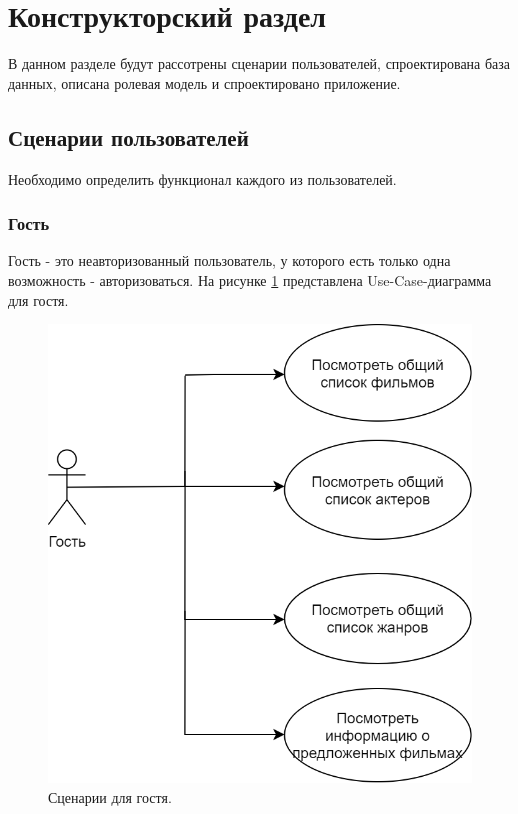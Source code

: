 \clearpage
\section{Конструкторский раздел}
В данном разделе будут рассотрены сценарии пользователей, спроектирована база данных, описана ролевая модель и спроектировано приложение.
\subsection{Сценарии пользователей}
Необходимо определить функционал каждого из пользователей. 
\subsubsection{Гость}
Гость - это неавторизованный пользователь, у которого есть только одна возможность - авторизоваться. На рисунке \ref{img:UseCaseGuest} представлена Use-Case-диаграмма для гостя.

\begin{figure}[h!]
	\centering
	\includegraphics[scale=0.35]{img/UseCaseGuest.png}
	\caption{Сценарии для гостя.}
	\label{img:UseCaseGuest}
\end{figure}


